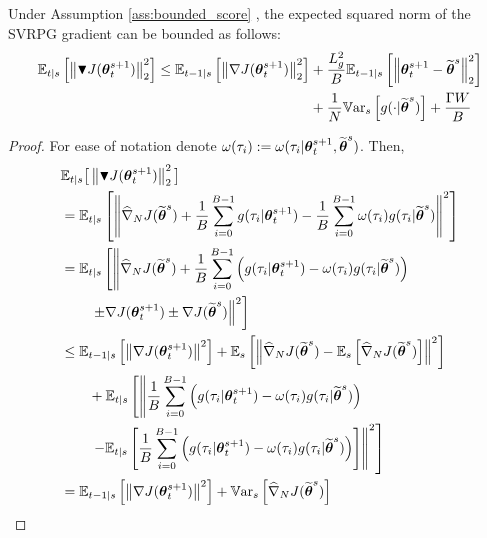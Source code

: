 \begin{lemma}\label{lemma:aux2}
	Under Assumption \ref{ass:bounded_score}
	, the expected squared norm of the \acs{SVRPG} gradient can be bounded as follows:
  \begin{align*}
	\Ets{\norm[2]{\gradBlack{\vtheta_t^{s+1}}}^2} \leq
	\Ets[t-1]{\norm[2]{\gradJ{\vtheta_t^{s+1}}}^2} 
	&+\frac{L_g^2}{B}\Ets[t-1]{\norm[2]{\vtheta_t^{s+1}-\wt{\vtheta}^s}^2}\\
	&+\frac{1}{N}\Vars{g(\cdot\vert\wt{\vtheta}^s)}
	\nonumber 
	+\frac{\Gamma\VARIS}{B}
	\end{align*}
\end{lemma}
\begin{proof}
	For ease of notation denote $\omega(\tau_i) := \omega(\tau_i|\vtheta^{s+1}_t, \wt{\vtheta}^{s})$. Then,
	\begingroup
	\allowdisplaybreaks
	\begin{align}
	&\mathbb{E}_{t|s}\big[\norm[2]{\gradBlack{\vtheta_t^{s+1}}}^2\big] \\
	&= \Ets{\norm[]{\gradApp{\wt{\vtheta}^s}{N}
			+\frac{1}{B}\sum_{i=0}^{B-1} g(\tau_i\vert\vtheta_t^{s+1})
			-\frac{1}{B}\sum_{i=0}^{B-1}
			\omega(\tau_i)g(\tau_i\vert\wt{\vtheta}^s)}^2} \nonumber\\
	&= \mathbb{E}_{t\vert s}\left[\left\|\gradApp{\wt{\vtheta}^s}{N}
	+\frac{1}{B}\sum_{i=0}^{B-1}\left( 
	g(\tau_i\vert\vtheta_t^{s+1}) -
	\omega(\tau_i)g(\tau_i\vert\wt{\vtheta}^s)\right)
	 \right.\right.\nonumber
	\\&\qquad\left.\left.
	\pm \gradJ{\vtheta_t^{s+1}} \pm \gradJ{\wt{\vtheta}^s} 
	\right\|^2\right] \nonumber\\
	&\leq \Ets[t-1]{\norm[]{\gradJ{\vtheta_t^{s+1}}}^2}
	+\Es{\norm[]{\gradApp{\wt{\vtheta}^s}{N} - \Es{\gradApp{\wt{\vtheta}^s}{N}}}^2} \nonumber\\
	&\qquad+ 
	\mathbb{E}_{t\vert s}\left[\left\|
	\frac{1}{B}\sum_{i=0}^{B-1}\left(
	g(\tau_i\vert\vtheta_t^{s+1}) -
	\omega(\tau_i)g(\tau_i\vert\wt{\vtheta}^s)\right)
		\right.\right.\nonumber\\&\qquad\left.\left.
	- \Ets{
		\frac{1}{B}\sum_{i=0}^{B-1}\left(
		g(\tau_i\vert\vtheta_t^{s+1}) -
		\omega(\tau_i)g(\tau_i\vert\wt{\vtheta}^s)\right)}\right\|^2\right] 
	\nonumber\\
	&= \Ets[t-1]{\norm[]{\gradJ{\vtheta_t^{s+1}}}^2}
	+\Vars{\gradApp{\wt{\vtheta}^s}{N}} \nonumber\\

\end{align}
\end{proof}
